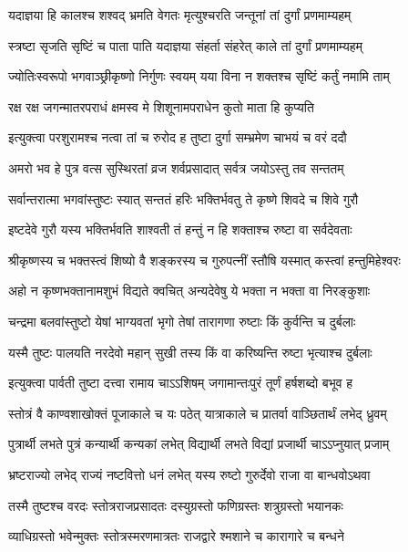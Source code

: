 \twolineshloka
{यदाज्ञया हि कालश्च शश्वद् भ्रमति वेगतः}
{मृत्युश्चरति जन्तूनां तां दुर्गां प्रणमाम्यहम्}

\twolineshloka
{स्त्रष्टा सृजति सृष्टिं च पाता पाति यदाज्ञया}
{संहर्ता संहरेत् काले तां दुर्गां प्रणमाम्यहम्}

\twolineshloka
{ज्योतिःस्वरूपो भगवाञ्छ्रीकृष्णो निर्गुणः स्वयम्}
{यया विना न शक्तश्च सृष्टिं कर्तुं नमामि ताम्}

\twolineshloka
{रक्ष रक्ष जगन्मातरपराधं क्षमस्व मे}
{शिशूनामपराधेन कुतो माता हि कुप्यति}

\twolineshloka
{इत्युक्त्वा परशुरामश्च नत्वा तां च रुरोद ह}
{तुष्टा दुर्गा सम्भ्रमेण चाभयं च वरं ददौ}

\twolineshloka
{अमरो भव हे पुत्र वत्स सुस्थिरतां व्रज}
{शर्वप्रसादात् सर्वत्र जयोऽस्तु तव सन्ततम्}


\twolineshloka
{सर्वान्तरात्मा भगवांस्तुष्टः स्यात् सन्ततं हरिः}
{भक्तिर्भवतु ते कृष्णे शिवदे च शिवे गुरौ}

\twolineshloka
{इष्टदेवे गुरौ यस्य भक्तिर्भवति शाश्वती}
{तं हन्तुं न हि शक्ताश्च रुष्टा वा सर्वदेवताः}

\twolineshloka
{श्रीकृष्णस्य च भक्तस्त्वं शिष्यो वै शङ्करस्य च}
{गुरुपत्‍‌नीं स्तौषि यस्मात् कस्त्वां हन्तुमिहेश्वरः}

\twolineshloka
{अहो न कृष्णभक्तानामशुभं विद्यते क्वचित्}
{अन्यदेवेषु ये भक्ता न भक्ता वा निरङ्कुशाः}

\twolineshloka
{चन्द्रमा बलवांस्तुष्टो येषां भाग्यवतां भृगो}
{तेषां तारागणा रुष्टाः किं कुर्वन्ति च दुर्बलाः}

\twolineshloka
{यस्मै तुष्टः पालयति नरदेवो महान् सुखी}
{तस्य किं वा करिष्यन्ति रुष्टा भृत्याश्च दुर्बलाः}

\twolineshloka
{इत्युक्त्वा पार्वती तुष्टा दत्त्‍‌वा रामाय चाऽऽशिषम्}
{जगामान्तःपुरं तूर्णं हर्षशब्दो बभूव ह}


\twolineshloka
{स्तोत्रं वै काण्वशाखोक्तं पूजाकाले च यः पठेत्}
{यात्राकाले च प्रातर्वा वाञ्छितार्थं लभेद् ध्रुवम्}

\twolineshloka
{पुत्रार्थी लभते पुत्रं कन्यार्थी कन्यकां लभेत्}
{विद्यार्थी लभते विद्यां प्रजार्थी चाऽऽप्नुयात् प्रजाम्}

\twolineshloka
{भ्रष्टराज्यो लभेद् राज्यं नष्टवित्तो धनं लभेत्}
{यस्य रुष्टो गुरुर्देवो राजा वा बान्धवोऽथवा}

\twolineshloka
{तस्मै तुष्टश्च वरदः स्तोत्रराजप्रसादतः}
{दस्युग्रस्तो फणिग्रस्तः शत्रुग्रस्तो भयानकः}

\twolineshloka
{व्याधिग्रस्तो भवेन्मुक्तः स्तोत्रस्मरणमात्रतः}
{राजद्वारे श्मशाने च कारागारे च बन्धने}

